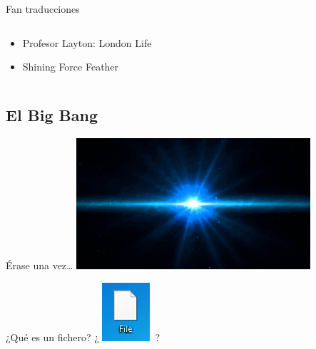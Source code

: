 \begin{frame}{Fan traducciones}
\begin{columns}
\begin{column}{0.5\textwidth}
        \hfill
        \vfill
        \begin{itemize}
            \item<3-> Profesor Layton: London Life
            \item<4-> Shining Force Feather
        \end{itemize}
    \end{column}
    \end{columns}
\end{frame}

\subsection{El Big Bang}
\begin{frame}{Érase una vez\ldots}
    \centering \includegraphics[width=0.65\textwidth]{imgs/bigbang.jpg}
\end{frame}

\begin{frame}{¿Qué es un fichero?}
    \centering\fontsize{80}{0}\selectfont
    ¿ \includegraphics{imgs/file.png}~?
\end{frame}

